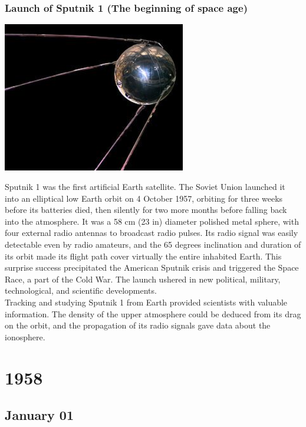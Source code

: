 \documentclass[11pt]{report}
\begin{document}
\subsection{Launch of Sputnik 1 (The beginning of space age)}
\vspace{2mm}\begin{center}\includegraphics[width=8cm]{./img/sputnik1.jpg}\end{center}
Sputnik 1 was the first artificial Earth satellite. The Soviet Union launched it into an elliptical low Earth orbit on 4 October 1957, orbiting for three weeks before its batteries died, then silently for two more months before falling back into the atmosphere. It was a 58 cm (23 in) diameter polished metal sphere, with four external radio antennas to broadcast radio pulses. Its radio signal was easily detectable even by radio amateurs, and the 65 degrees inclination and duration of its orbit made its flight path cover virtually the entire inhabited Earth. This surprise success precipitated the American Sputnik crisis and triggered the Space Race, a part of the Cold War. The launch ushered in new political, military, technological, and scientific developments.\\
\indent Tracking and studying Sputnik 1 from Earth provided scientists with valuable information. The density of the upper atmosphere could be deduced from its drag on the orbit, and the propagation of its radio signals gave data about the ionosphere.

\chapter{1958}
\section{January 01}
\end{document}

